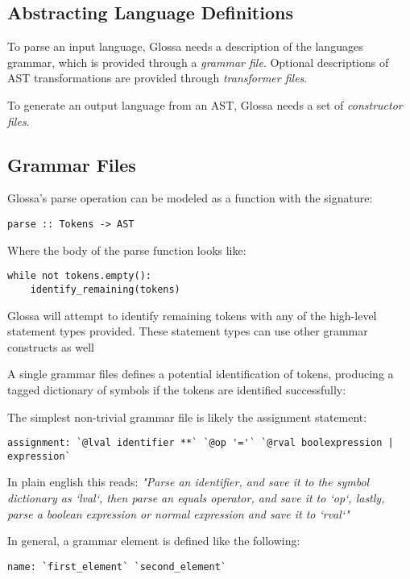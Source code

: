 \documentclass{article}
\begin{document}
\subsection{Abstracting Language Definitions}

To parse an input language, Glossa needs a description of the languages grammar, which is provided through a \textit{grammar file}.
Optional descriptions of AST transformations are provided through \textit{transformer files}.

To generate an output language from an AST, Glossa needs a set of \textit{constructor files}.

\subsection{Grammar Files}

Glossa's parse operation can be modeled as a function with the signature:

\begin{verbatim}
parse :: Tokens -> AST
\end{verbatim}

Where the body of the parse function looks like:

\lstset{language=Python}
\begin{lstlisting}
while not tokens.empty():
    identify_remaining(tokens)
\end{lstlisting}

Glossa will attempt to identify remaining tokens with any of the high-level statement types provided.
These statement types can use other grammar constructs as well

A single grammar files defines a potential identification of tokens, producing a tagged dictionary of symbols if the tokens are identified successfully:

The simplest non-trivial grammar file is likely the assignment statement:
\begin{verbatim}
assignment: `@lval identifier **` `@op '='` `@rval boolexpression | expression`
\end{verbatim}

In plain english this reads:
\textit{"Parse an identifier, and save it to the symbol dictionary as `lval`, then parse an equals operator, and save it to `op`, lastly, parse a boolean expression or normal expression and save it to `rval`"}

In general, a grammar element is defined like the following:

\begin{verbatim}
name: `first_element` `second_element`
\end{verbatim}
\end{document}
